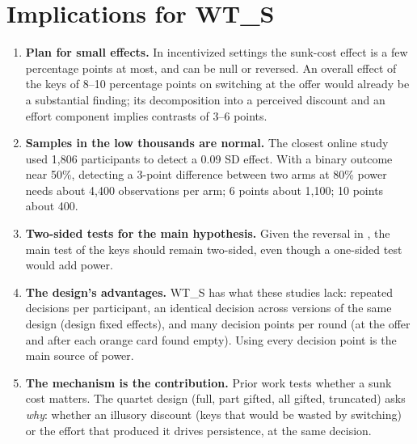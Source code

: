 \documentclass[11pt]{article}
\begin{document}
\section{Implications for WT\_S}

\begin{enumerate}
\item \textbf{Plan for small effects.} In incentivized settings the sunk-cost effect is a few percentage points at most, and can be null or reversed. An overall effect of the keys of 8--10 percentage points on switching at the offer would already be a substantial finding; its decomposition into a perceived discount and an effort component implies contrasts of 3--6 points.
\item \textbf{Samples in the low thousands are normal.} The closest online study \citep{beknazar2025} used 1,806 participants to detect a 0.09 SD effect. With a binary outcome near 50\%, detecting a 3-point difference between two arms at 80\% power needs about 4,400 observations per arm; 6 points about 1,100; 10 points about 400.
\item \textbf{Two-sided tests for the main hypothesis.} Given the reversal in \citet{negrini2022}, the main test of the keys should remain two-sided, even though a one-sided test would add power.
\item \textbf{The design's advantages.} WT\_S has what these studies lack: repeated decisions per participant, an identical decision across versions of the same design (design fixed effects), and many decision points per round (at the offer and after each orange card found empty). Using every decision point is the main source of power.
\item \textbf{The mechanism is the contribution.} Prior work tests whether a sunk cost matters. The quartet design (full, part gifted, all gifted, truncated) asks \emph{why}: whether an illusory discount (keys that would be wasted by switching) or the effort that produced it drives persistence, at the same decision.
\end{enumerate}
\end{document}
